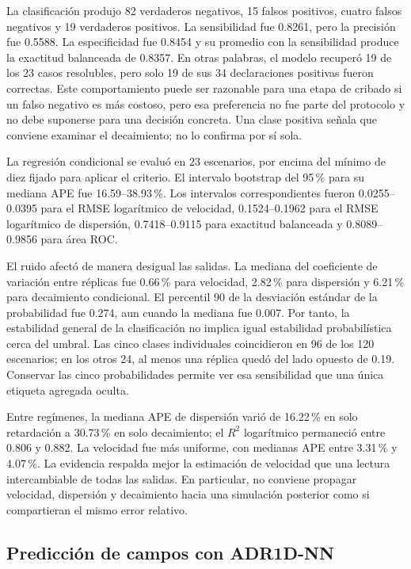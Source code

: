 \documentclass[11pt,a4paper]{article}
\begin{document}
La clasificación produjo 82 verdaderos negativos, 15 falsos positivos, cuatro
falsos negativos y 19 verdaderos positivos. La sensibilidad fue 0.8261, pero
la precisión fue 0.5588. La especificidad fue 0.8454 y su promedio con la
sensibilidad produce la exactitud balanceada de 0.8357. En otras palabras, el
modelo recuperó 19 de los 23 casos resolubles, pero solo 19 de sus 34
declaraciones positivas fueron correctas. Este comportamiento puede ser
razonable para una etapa de cribado si un falso negativo es más costoso, pero
esa preferencia no fue parte del protocolo y no debe suponerse para una decisión
concreta. Una clase positiva señala que conviene examinar el decaimiento; no lo
confirma por sí sola.

La regresión condicional se evaluó en 23 escenarios, por encima del mínimo de
diez fijado para aplicar el criterio. El intervalo bootstrap del 95\,\% para su
mediana APE fue 16.59--38.93\,\%. Los intervalos correspondientes fueron
0.0255--0.0395 para el RMSE logarítmico de velocidad, 0.1524--0.1962 para el
RMSE logarítmico de dispersión, 0.7418--0.9115 para exactitud balanceada y
0.8089--0.9856 para área ROC.

El ruido afectó de manera desigual las salidas. La mediana del coeficiente de
variación entre réplicas fue 0.66\,\% para velocidad, 2.82\,\% para dispersión
y 6.21\,\% para decaimiento condicional. El percentil 90 de la desviación
estándar de la probabilidad fue 0.274, aun cuando la mediana fue 0.007. Por
tanto, la estabilidad general de la clasificación no implica igual estabilidad
probabilística cerca del umbral. Las cinco clases individuales coincidieron en
96 de los 120 escenarios; en los otros 24, al menos una réplica quedó del lado
opuesto de 0.19. Conservar las cinco probabilidades permite ver esa sensibilidad
que una única etiqueta agregada oculta.

Entre regímenes, la mediana APE de dispersión varió de 16.22\,\% en solo
retardación a 30.73\,\% en solo decaimiento; el $R^2$ logarítmico permaneció
entre 0.806 y 0.882. La velocidad fue más uniforme, con medianas APE entre
3.31\,\% y 4.07\,\%. La evidencia respalda mejor la estimación de velocidad que
una lectura intercambiable de todas las salidas. En particular, no conviene
propagar velocidad, dispersión y decaimiento hacia una simulación posterior
como si compartieran el mismo error relativo.

\subsection{Predicción de campos con ADR1D-NN}
\end{document}
